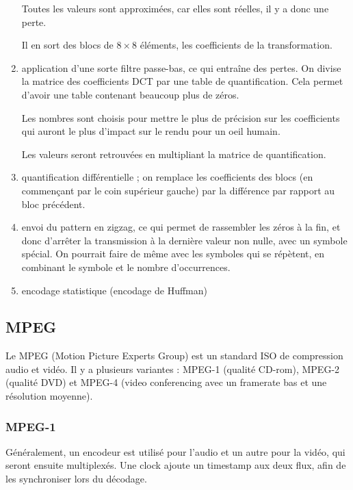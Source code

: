 \begin{enumerate}
			Toutes les valeurs sont approximées, car elles sont réelles, il y a donc une perte.
			
			Il en sort des blocs de $8 \times 8$ éléments, les coefficients de la transformation.
			
			\item application d'une sorte filtre passe-bas, ce qui entraîne des pertes. On divise la matrice des coefficients DCT par une table de quantification. Cela permet d'avoir une table contenant beaucoup plus de zéros.
			
			
			Les nombres sont choisis pour mettre le plus de précision sur les coefficients qui auront le plus d'impact sur le rendu pour un oeil humain.
			
			Les valeurs seront retrouvées en multipliant la matrice de quantification.
			
			\item quantification différentielle ; on remplace les coefficients des blocs (en commençant par le coin supérieur gauche) par la différence par rapport au bloc précédent.
			
			\item envoi du pattern en zigzag, ce qui permet de rassembler les zéros à la fin, et donc d'arrêter la transmission à la dernière valeur non nulle, avec un symbole spécial. On pourrait faire de même avec les symboles qui se répètent, en combinant le symbole et le nombre d'occurrences.
			
			
			\item encodage statistique (encodage de Huffman)
			
		\end{enumerate}
		

		\subsection{MPEG}
		
		Le MPEG (Motion Picture Experts Group) est un standard ISO de compression audio et vidéo. Il y a plusieurs variantes : MPEG-1 (qualité CD-rom), MPEG-2 (qualité DVD) et MPEG-4 (video conferencing avec un framerate bas et une résolution moyenne).
		
			\subsubsection{MPEG-1}
			Généralement, un encodeur est utilisé pour l'audio et un autre pour la vidéo, qui seront ensuite multiplexés. Une clock ajoute un timestamp aux deux flux, afin de les synchroniser lors du décodage.
		
